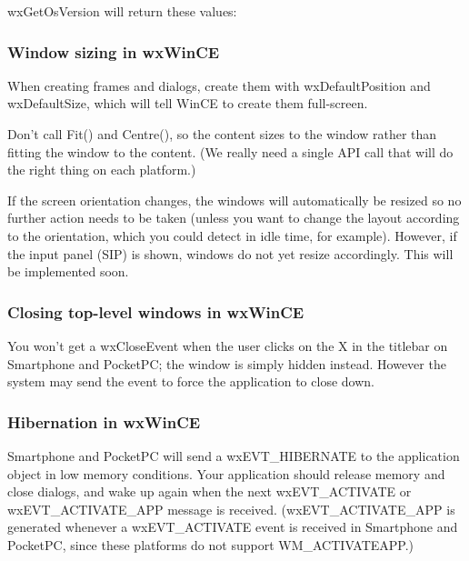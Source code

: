 wxGetOsVersion will return these values:

\begin{twocollist}\itemsep=0pt
\end{twocollist}

\subsubsection{Window sizing in wxWinCE}

When creating frames and dialogs, create them with wxDefaultPosition and
wxDefaultSize, which will tell WinCE to create them full-screen.

Don't call Fit() and Centre(), so the content sizes to
the window rather than fitting the window to the content. (We really need a single API call
that will do the right thing on each platform.)

If the screen orientation changes, the windows will automatically be resized
so no further action needs to be taken (unless you want to change the layout
according to the orientation, which you could detect in idle time, for example).
However, if the input panel (SIP) is shown, windows do not yet resize accordingly. This will
be implemented soon.

\subsubsection{Closing top-level windows in wxWinCE}

You won't get a wxCloseEvent when the user clicks on the X in the titlebar
on Smartphone and PocketPC; the window is simply hidden instead. However the system may send the
event to force the application to close down.

\subsubsection{Hibernation in wxWinCE}

Smartphone and PocketPC will send a wxEVT\_HIBERNATE to the application object in low
memory conditions. Your application should release memory and close dialogs,
and wake up again when the next wxEVT\_ACTIVATE or wxEVT\_ACTIVATE\_APP message is received.
(wxEVT\_ACTIVATE\_APP is generated whenever a wxEVT\_ACTIVATE event is received
in Smartphone and PocketPC, since these platforms do not support WM\_ACTIVATEAPP.)

